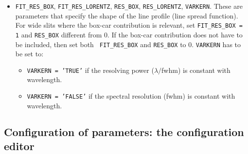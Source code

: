 \begin{itemize}
  
\item {\tt FIT\_RES\_BOX}, {\tt FIT\_RES\_LORENTZ}, {\tt RES\_BOX},
  {\tt RES\_LORENTZ}, {\tt VARKERN}. These are parameters that specify
  the shape of the line profile (line spread function). For wide slits
  where the box-car contribution is relevant, set {\tt FIT\_RES\_BOX =
    1} and {\tt RES\_BOX} different from 0. If the box-car
  contribution does not have to be included, then set both {\tt
    FIT\_RES\_BOX} and {\tt RES\_BOX} to 0.  {\tt VARKERN} has to be
  set to:
  \begin{itemize}
  \item {\tt VARKERN = 'TRUE'} if the resolving power ($\lambda/$fwhm) is constant
    with wavelength.
    \item {\tt VARKERN = 'FALSE'} if the spectral resolution (fwhm) is constant with wavelength.
  \end{itemize}
\end{itemize}



\subsection{Configuration of parameters: the configuration editor}
\label{sec:configuration_editor}

